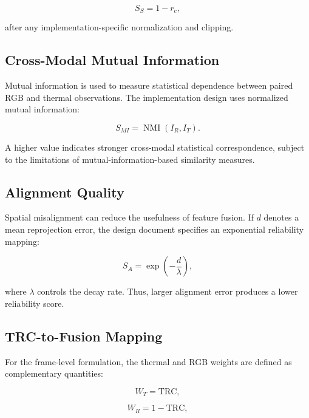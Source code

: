 \documentclass[conference]{IEEEtran}
\begin{document}
\begin{equation}
S_S=1-r_c,
\label{eq:saturation}
\end{equation}

after any implementation-specific normalization and clipping.

\subsection{Cross-Modal Mutual Information}

Mutual information is used to measure statistical dependence between paired RGB and thermal observations. The implementation design uses normalized mutual information:

\begin{equation}
S_{MI}=\operatorname{NMI}(I_R,I_T).
\label{eq:nmi}
\end{equation}

A higher value indicates stronger cross-modal statistical correspondence, subject to the limitations of mutual-information-based similarity measures.

\subsection{Alignment Quality}

Spatial misalignment can reduce the usefulness of feature fusion. If $d$ denotes a mean reprojection error, the design document specifies an exponential reliability mapping:

\begin{equation}
S_A=\exp\left(-\frac{d}{\lambda}\right),
\label{eq:alignment}
\end{equation}

where $\lambda$ controls the decay rate. Thus, larger alignment error produces a lower reliability score.

\subsection{TRC-to-Fusion Mapping}

For the frame-level formulation, the thermal and RGB weights are defined as complementary quantities:

\begin{equation}
W_T=\mathrm{TRC},
\label{eq:thermalweight}
\end{equation}

\begin{equation}
W_R=1-\mathrm{TRC},
\label{eq:rgbweight}
\end{equation}
\end{document}
